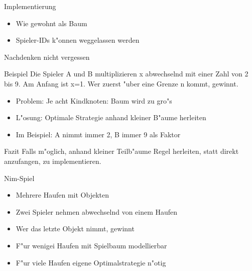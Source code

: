 \documentclass[18pt]{beamer}
\begin{document}
\begin{frame}{Implementierung}
\begin{itemize}
\item Wie gewohnt als Baum

\item Spieler-IDs k"onnen weggelassen werden

\end{itemize}
\end{frame}

\begin{frame}{Nachdenken nicht vergessen}
\begin{block}{Beispiel}
Die Spieler A und B multiplizieren x abwechselnd mit einer Zahl von 2 bis 9. Am Anfang ist x=1. Wer zuerst "uber eine Grenze n kommt, gewinnt.
\end{block}
\pause
\begin{itemize}
\item Problem: Je acht Kindknoten: Baum wird zu gro"s
\item L"osung: Optimale Strategie anhand kleiner B"aume herleiten
\item Im Beispiel: A nimmt immer 2, B immer 9 als Faktor
\end{itemize}
\pause
\begin{block}{Fazit}
Falls m"oglich, anhand kleiner Teilb"aume Regel herleiten, statt direkt anzufangen, zu implementieren.
\end{block}
\end{frame}

\begin{frame}{Nim-Spiel}
\begin{itemize}
\item Mehrere Haufen mit Objekten
\item Zwei Spieler nehmen abwechselnd von einem Haufen
\item Wer das letzte Objekt nimmt, gewinnt
\item F"ur wenigei Haufen mit Spielbaum modellierbar
\item F"ur viele Haufen eigene Optimalstrategie n"otig
\end{itemize}
\end{frame}
\end{document}
